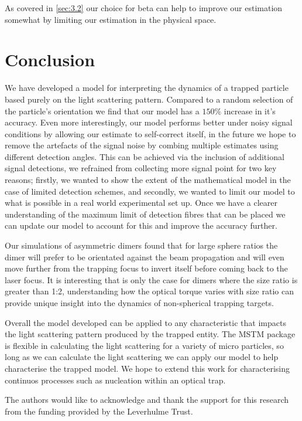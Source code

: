 \documentclass[preprint,3p]{elsarticle}
\begin{document}
As covered in \ref{sec:3.2} our choice for beta can help to improve our estimation somewhat by limiting our estimation in the physical space. 

\section{Conclusion}
\label{4}
We have developed a model for interpreting the dynamics of a trapped particle based purely on the light scattering pattern. Compared to a random selection of the particle's orientation we find that our model has a $150\%$ increase in it's accuracy. Even more interestingly, our model performs better under noisy signal conditions by allowing our estimate to self-correct itself, in the future we hope to remove the artefacts of the signal noise by combing multiple estimates using different detection angles. This can be achieved via the inclusion of additional signal detections, we refrained from collecting more signal point for two key reasons; firstly, we wanted to show the extent of the mathematical model in the case of limited detection schemes, and secondly, we wanted to limit our model to what is possible in a real world experimental set up. Once we have a clearer understanding of the maximum limit of detection fibres that can be placed we can update our model to account for this and improve the accuracy further. 

Our simulations of asymmetric dimers found that for large sphere ratios the dimer will prefer to be orientated against the beam propagation and will even move further from the trapping focus to invert itself before coming back to the laser focus. It is interesting that is only the case for dimers where the size ratio is greater than 1:2, understanding how the optical torque varies with size ratio can provide unique insight into the dynamics of non-spherical trapping targets.  

Overall the model developed can be applied to any characteristic that impacts the light scattering pattern produced by the trapped entity. The MSTM package is flexible in  calculating the light scattering for a variety of micro particles, so long as we can calculate the light scattering we can apply our model to help characterise the trapped model. We hope to extend this work for characterising continuos processes such as nucleation within an optical trap.  

The authors would like to acknowledge and thank the support for this research from the funding provided by the Leverhulme Trust.  
\end{document}

